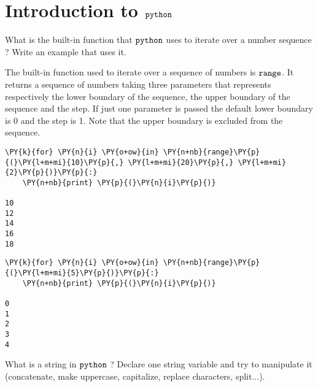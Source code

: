 \chapter{Introduction to $\tt{python}$}\label{introduction-to-python---lesson-1}

\begin{Exercise}[label={pippo}]
What is the built-in function that \(\tt{python}\) uses to iterate over a number sequence ? Write an example that uses it.
\end{Exercise}

\begin{Answer}
The built-in function used to iterate over a sequence of numbers is
\(\tt{range}\). It returns a sequence of numbers taking three parameters
that represents respectively the lower boundary of the sequence, the
upper boundary of the sequence and the step. If just one parameter is
passed the default lower boundary is 0 and the step is 1. Note that the
upper boundary is excluded from the sequence.

\begin{codebox}[size=fbox, boxrule=1pt, colback=cellbackground, colframe=cellborder]
\begin{Verbatim}[commandchars=\\\{\}]
\PY{k}{for} \PY{n}{i} \PY{o+ow}{in} \PY{n+nb}{range}\PY{p}{(}\PY{l+m+mi}{10}\PY{p}{,} \PY{l+m+mi}{20}\PY{p}{,} \PY{l+m+mi}{2}\PY{p}{)}\PY{p}{:}
    \PY{n+nb}{print} \PY{p}{(}\PY{n}{i}\PY{p}{)}

10
12
14
16
18
\end{Verbatim}
\end{codebox}

\begin{codebox}[size=fbox, boxrule=1pt, colback=cellbackground, colframe=cellborder]
\begin{Verbatim}[commandchars=\\\{\}]
\PY{k}{for} \PY{n}{i} \PY{o+ow}{in} \PY{n+nb}{range}\PY{p}{(}\PY{l+m+mi}{5}\PY{p}{)}\PY{p}{:}
    \PY{n+nb}{print} \PY{p}{(}\PY{n}{i}\PY{p}{)}

0
1
2
3
4
\end{Verbatim}
\end{codebox}
\end{Answer}

\begin{Exercise}{}
What is a string in \(\tt{python}\) ? Declare one string variable and try to manipulate it (concatenate, make uppercase, capitalize, replace characters, split...).
\end{Exercise}

